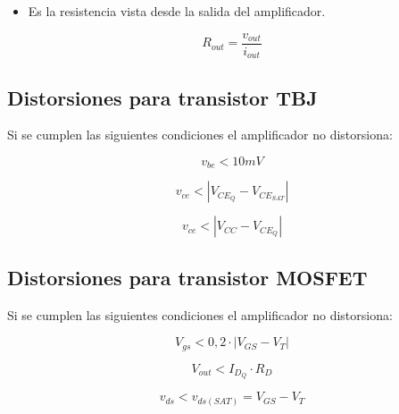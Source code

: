 \begin{itemize}
    \item Es la resistencia vista desde la salida del amplificador. 
\end{itemize}
\begin{equation}
    R_{out} = \frac{v_{out}}{i_{out}}
\end{equation}



\subsection{Distorsiones para transistor TBJ}

Si se cumplen las siguientes condiciones el amplificador no distorsiona:

\begin{equation}
    v_{be} < 10mV
\end{equation}

\begin{equation}
    v_{ce} < |V_{CE_Q} - V_{CE_{SAT}}|
\end{equation}

\begin{equation}
    v_{ce} < |V_{CC} - V_{CE_Q}|
\end{equation}

\subsection{Distorsiones para transistor MOSFET}

Si se cumplen las siguientes condiciones el amplificador no distorsiona:

\begin{equation}
    V_{gs} < 0,2\cdot|V_{GS} - V_T|
\end{equation}

\begin{equation}
    V_{out} < I_{D_Q}\cdot R_D
\end{equation}

\begin{equation}
    v_{ds} < v_{ds(SAT)} = V_{GS} - V_T
\end{equation}





